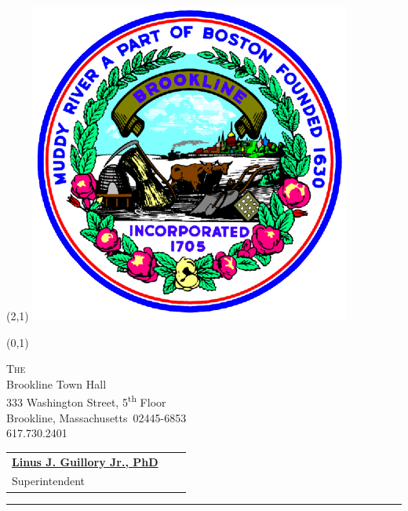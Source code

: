 \documentclass[11pt]{article}%
\def\docdate{2021/07/16}%
\def\docschooladdress{Brookline Town Hall\\333 Washington Street, 5\textsuperscript{th} Floor}
\def\docschoolcitystate{Brookline, Massachusetts}
\def\docschoolzip{02445-6853}
\def\docschoolphone{617.730.2401}
\begin{document}
\thispagestyle{first}

\setlength{\TPHorizModule}{.25in}
\setlength{\TPVertModule}{\TPHorizModule}
\textblockorigin{0.25in}{0.25in} %
\setlength{\parindent}{0pt}
\begin{textblock}{32}(2,1)
 \includegraphics*[scale = 0.175]{../images/TownofBrooklineLogo-color-400x400.png}
\end{textblock}
\begin{textblock}{32}(0,1)
 \begin{minipage}{\linewidth}\centering
  \large\textsc{The \docdistrict} \\
  \normalsize{\docschooladdress} \\
  \normalsize{\docschoolcitystate\ \docschoolzip} \\
  \normalsize{\docschoolphone}
 \end{minipage}
\end{textblock}
\begin{tabularx}{\textwidth}{@{}lXr@{}}\\[1.0cm]
 \normalsize{\bf \href{http://t.ly/I4pl}{Linus J. Guillory Jr., PhD}} && \large\bf\textit{} \\[-0.5\parskip] %
 \normalsize{Superintendent} && \large\bf\textit{}
\end{tabularx}

{\color{black}\rule{\textwidth}{0.5pt}}\medskip%
\end{document}
